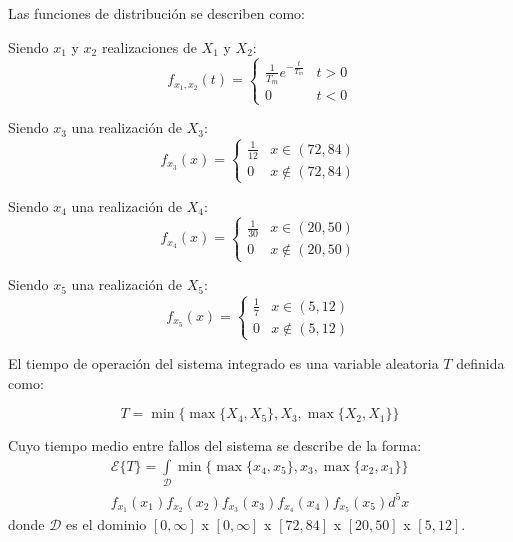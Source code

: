 \documentclass{sig-alternate}
\begin{document}
Las funciones de distribuci\'on se describen como:

Siendo $x_1$ y $x_2$ realizaciones de $X_1$ y $X_2$:
\begin{equation}
	f_{x_1, x_2}(t) = 
		\begin{cases}
		  \frac{1}{T_m} e^{-\frac{t}{T_m}} & t > 0 \\
		  0 & t < 0
		\end{cases}
\end{equation}

Siendo $x_3$ una realizaci\'on de $X_3$:
\begin{equation}
	f_{x_3}(x) = 
		\begin{cases}
		  \frac{1}{12} & x \in (72,84) \\
		  0 & x \notin (72,84)
		\end{cases}
\end{equation}

Siendo $x_4$ una realizaci\'on de $X_4$:
\begin{equation}
	f_{x_4}(x) = 
		\begin{cases}
		  \frac{1}{30} & x \in (20,50) \\
		  0 & x \notin (20,50)
		\end{cases}
\end{equation}

Siendo $x_5$ una realizaci\'on de $X_5$:
\begin{equation}
	f_{x_5}(x) = 
		\begin{cases}
		  \frac{1}{7} & x \in (5,12) \\
		  0 & x \notin (5,12)
		\end{cases}
\end{equation}

El tiempo de operaci\'on del sistema integrado es una variable 
aleatoria $T$ definida como:

\begin{equation}
 T = \min\{ \max \{ X_4, X_5 \} , X_3 , \max \{X_2, X_1\}\}
\end{equation}

Cuyo tiempo medio entre fallos del sistema se describe de la forma:
\begin{eqnarray}
\label{integralsintrans}
	\mathcal{E} \{ T \} = \int\limits_{\mathcal{D}} \min\{ \max \{ x_4, x_5 \} , x_3 , \max \{x_2, x_1\}\}
	\nonumber
	\\
	f_{x_1}(x_1) f_{x_2}(x_2) f_{x_3}(x_3) f_{x_4}(x_4) f_{x_5}(x_5) d^5x
\end{eqnarray}
donde $\mathcal{D}$ es el dominio $[0,\infty]$ x $[0,\infty]$ x $[72,84]$ x $[20,50]$ x $[5,12]$.
\end{document}
